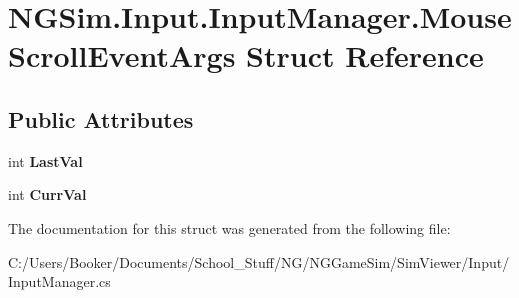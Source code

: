 \hypertarget{struct_n_g_sim_1_1_input_1_1_input_manager_1_1_mouse_scroll_event_args}{}\section{N\+G\+Sim.\+Input.\+Input\+Manager.\+Mouse\+Scroll\+Event\+Args Struct Reference}
\label{struct_n_g_sim_1_1_input_1_1_input_manager_1_1_mouse_scroll_event_args}
\subsection*{Public Attributes}
\begin{DoxyCompactItemize}
\item 
\mbox{\label{struct_n_g_sim_1_1_input_1_1_input_manager_1_1_mouse_scroll_event_args_a9f6ef7e21233c1d628cffe3b49b2914d}} 
int {\bfseries Last\+Val}
\item 
\mbox{\label{struct_n_g_sim_1_1_input_1_1_input_manager_1_1_mouse_scroll_event_args_ae710c6ee8ec393533bfb9bf81c25c92e}} 
int {\bfseries Curr\+Val}
\end{DoxyCompactItemize}


The documentation for this struct was generated from the following file\+:\begin{DoxyCompactItemize}
\item 
C\+:/\+Users/\+Booker/\+Documents/\+School\+\_\+\+Stuff/\+N\+G/\+N\+G\+Game\+Sim/\+Sim\+Viewer/\+Input/Input\+Manager.\+cs\end{DoxyCompactItemize}
